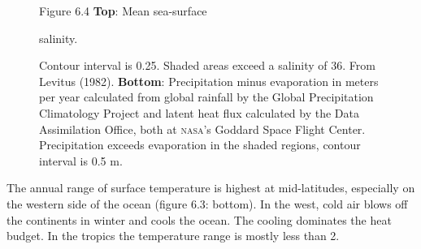 \begin{figure}[t!]
\footnotesize
Figure 6.4 \textbf{Top}: Mean sea-surface \rule{0pt}{3ex}
salinity. \rule{0mm}{2ex}Contour interval is 0.25. Shaded areas exceed
a salinity of 36. From Levitus (1982).  \textbf{Bottom}: Precipitation
minus evaporation in meters per year calculated from global
rainfall by the Global Precipitation
Climatology Project and latent heat flux calculated by the Data
Assimilation Office, both at \textsc{nasa}'s Goddard Space Flight
Center. Precipitation exceeds evaporation in the shaded regions,
contour interval is 0.5 m.

\label{fig:salinity}
\vspace{-3ex}
\end{figure}

The annual range of surface temperature is highest at mid-latitudes,
especially on the western side of the ocean (figure 6.3: bottom). In
the west, cold air blows off the continents in winter and cools the
ocean. The cooling dominates the heat budget. In the tropics the
temperature range is mostly less than 2.

